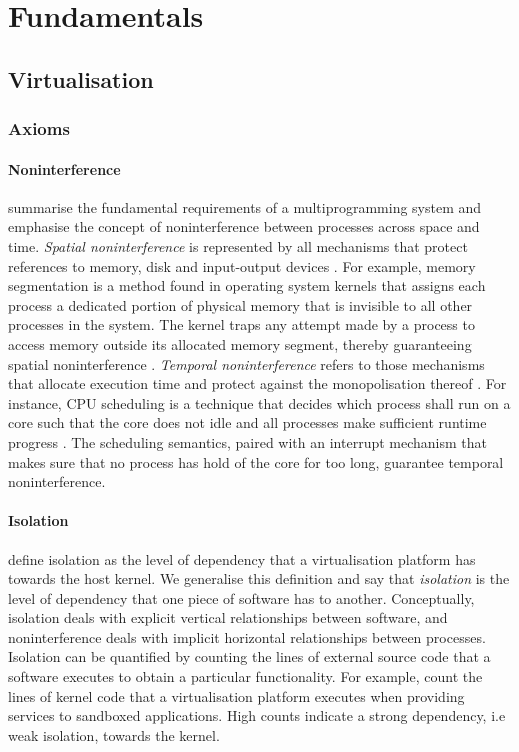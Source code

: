 \chapter{Fundamentals}
\section{Virtualisation}
\subsection{Axioms}
\label{ch:fundamentals/virtualisation/axioms}
\subsubsection{Noninterference}
\label{ch:fundamentals/virtualisation/axioms/noninterference}
\textcite{10.1145/368481.368502} summarise the fundamental requirements of a multiprogramming 
system and emphasise the concept of noninterference between processes across space and time. 
\textit{Spatial noninterference} is represented by all mechanisms that protect references to memory, 
disk and input-output devices \cite{10.1145/368481.368502}. For example, memory segmentation 
is a method found in operating system kernels that assigns each process a dedicated portion
of physical memory that is invisible to all other processes in the system. The kernel traps 
any attempt made by a process to access memory outside its allocated memory segment, thereby 
guaranteeing spatial noninterference \cite{10.5555/2490781}. \textit{Temporal noninterference} refers
to those mechanisms that allocate execution time and protect against the monopolisation thereof 
\cite{10.1145/368481.368502}. For instance, CPU scheduling is a technique that decides which process 
shall run on a core such that the core does not idle and all processes make sufficient 
runtime progress \cite{10.5555/2490781}. The scheduling semantics, paired with an interrupt mechanism 
that makes sure that no process has hold of the core for too long, guarantee temporal noninterference.

\subsubsection{Isolation}
\label{ch:fundamentals/virtualisation/axioms/isolation}
\textcite{10.1145/3381052.3381315} define isolation as the level of dependency that a virtualisation 
platform has towards the host kernel. We generalise this definition and say that \textit{isolation} 
is the level of dependency that one piece of software has to another. Conceptually, isolation 
deals with explicit vertical relationships between software, and noninterference deals with 
implicit horizontal relationships between processes. Isolation can be quantified by counting the 
lines of external source code that a software executes to obtain a particular functionality. 
For example, \textcite{10.1145/3381052.3381315} count the lines of kernel code 
that a virtualisation platform executes when providing services to sandboxed applications. 
High counts indicate a strong dependency, i.e weak isolation, towards the kernel. 

